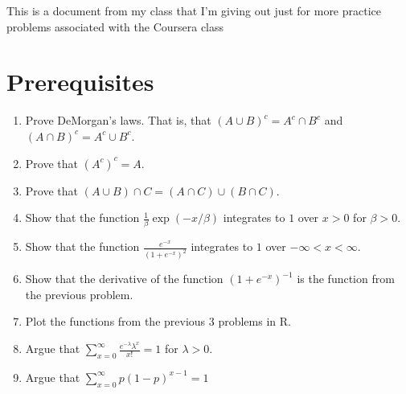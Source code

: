 \documentclass[12pt]{article}
\begin{document}
This is a document from my class that I'm giving out just for more practice problems associated with the Coursera class
\section{Prerequisites}
\begin{enumerate}[1.]
\item Prove DeMorgan's laws. That is, that $(A \cup B ) ^c = A^c \cap B^c$ and $(A \cap B) ^ c = A^c \cup B^c$.
\item Prove that $(A^c)^c = A$.
\item Prove that $(A \cup B) \cap C = (A\cap C) \cup (B\cap C)$.
\item Show that the function $\frac{1}{\beta} \exp(-x / \beta)$ integrates to $1$ over $x > 0$ for $\beta > 0$.
\item Show that the function $\frac{e^{-x}}{\left(1+  e^{-x} \right)^2}$ integrates to $1$ over $-\infty < x < \infty$.
\item Show that the derivative of the function $(1 + e^{-x})^{-1}$ is the function from the previous problem.
\item Plot the functions from the previous 3 problems in R.
\item Argue that $\sum_{x=0}^\infty \frac{e^{-\lambda}\lambda^x}{x!} = 1$ for $\lambda > 0$.
\item Argue that $\sum_{x=0}^\infty p(1 - p)^{x-1} = 1$ 
\end{enumerate}
\end{document}
